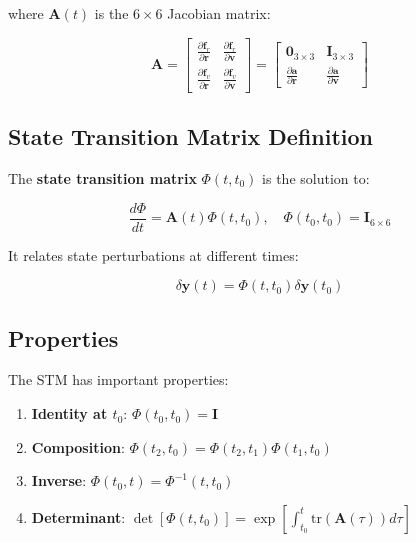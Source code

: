 where $\mathbf{A}(t)$ is the $6 \times 6$ Jacobian matrix:

\begin{equation}
    \mathbf{A} = \begin{bmatrix}
        \frac{\partial\mathbf{f}_r}{\partial\mathbf{r}} & \frac{\partial\mathbf{f}_r}{\partial\mathbf{v}} \\[8pt]
        \frac{\partial\mathbf{f}_v}{\partial\mathbf{r}} & \frac{\partial\mathbf{f}_v}{\partial\mathbf{v}}
    \end{bmatrix} = \begin{bmatrix}
        \mathbf{0}_{3\times3} & \mathbf{I}_{3\times3} \\[8pt]
        \frac{\partial\mathbf{a}}{\partial\mathbf{r}} & \frac{\partial\mathbf{a}}{\partial\mathbf{v}}
    \end{bmatrix}
\end{equation}

\subsection{State Transition Matrix Definition}

The \textbf{state transition matrix} $\Phi(t, t_0)$ is the solution to:

\begin{equation}
    \frac{d\Phi}{dt} = \mathbf{A}(t)\Phi(t, t_0), \quad \Phi(t_0, t_0) = \mathbf{I}_{6\times6}
\end{equation}

It relates state perturbations at different times:

\begin{equation}
    \delta\mathbf{y}(t) = \Phi(t, t_0) \delta\mathbf{y}(t_0)
\end{equation}

\subsection{Properties}

The STM has important properties:

\begin{enumerate}
    \item \textbf{Identity at $t_0$}: $\Phi(t_0, t_0) = \mathbf{I}$
    \item \textbf{Composition}: $\Phi(t_2, t_0) = \Phi(t_2, t_1)\Phi(t_1, t_0)$
    \item \textbf{Inverse}: $\Phi(t_0, t) = \Phi^{-1}(t, t_0)$
    \item \textbf{Determinant}: $\det[\Phi(t, t_0)] = \exp\left[\int_{t_0}^t \text{tr}(\mathbf{A}(\tau))d\tau\right]$
\end{enumerate}

